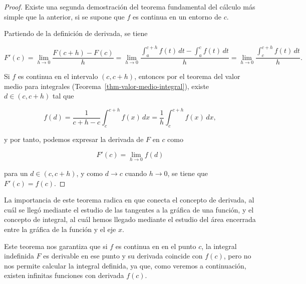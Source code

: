 \documentclass[
  a4paper,
]{scrreport}
\theoremstyle{plain}
\theoremstyle{definition}
\theoremstyle{plain}
\theoremstyle{plain}
\theoremstyle{definition}
\theoremstyle{definition}
\theoremstyle{remark}
\begin{document}
\begin{tcolorbox}[enhanced jigsaw, titlerule=0mm, arc=.35mm, colframe=quarto-callout-note-color-frame, bottomrule=.15mm, opacitybacktitle=0.6, rightrule=.15mm, coltitle=black, colback=white, toprule=.15mm, title=\textcolor{quarto-callout-note-color}{\faInfo}\hspace{0.5em}{Demostración 2}, leftrule=.75mm, bottomtitle=1mm, opacityback=0, breakable, colbacktitle=quarto-callout-note-color!10!white, toptitle=1mm, left=2mm]

\begin{proof}
Existe una segunda demostración del teorema fundamental del cálculo más
simple que la anterior, si se supone que \(f\) es continua en un entorno
de \(c\).

Partiendo de la definición de derivada, se tiene

\[
F'(c) 
= \lim_{h\to 0} \frac{F(c+h)-F(c)}{h} 
= \lim_{h\to 0} \frac{\int_a^{c+h}f(t)\,dt - \int_a^c f(t)\,dt}{h} 
= \lim_{h\to 0} \frac{\int_c^{c+h}f(t)\,dt}{h}.
\]

Si \(f\) es continua en el intervalo \((c, c+h)\), entonces por el
teorema del valor medio para integrales
(Teorema~\ref{thm-valor-medio-integral}), existe \(d\in(c,c+h)\) tal que

\[
f(d) 
= \frac{1}{c+h-c}\int_c^{c+h} f(x)\,dx 
= \frac{1}{h}\int_c^{c+h} f(x)\,dx,
\]

y por tanto, podemos expresar la derivada de \(F\) en \(c\) como

\[
F'(c) = \lim_{h\to 0} f(d)
\]

para un \(d\in(c,c+h)\), y como \(d\to c\) cuando \(h\to 0\), se tiene
que \(F'(c) = f(c)\).
\end{proof}

\end{tcolorbox}

La importancia de este teorema radica en que conecta el concepto de
derivada, al cuál se llegó mediante el estudio de las tangentes a la
gráfica de una función, y el concepto de integral, al cuál hemos llegado
mediante el estudio del área encerrada entre la gráfica de la función y
el eje \(x\).

\begin{tcolorbox}[enhanced jigsaw, titlerule=0mm, arc=.35mm, colframe=quarto-callout-warning-color-frame, bottomrule=.15mm, opacitybacktitle=0.6, rightrule=.15mm, coltitle=black, colback=white, toprule=.15mm, title=\textcolor{quarto-callout-warning-color}{\faExclamationTriangle}\hspace{0.5em}{Advertencia}, leftrule=.75mm, bottomtitle=1mm, opacityback=0, breakable, colbacktitle=quarto-callout-warning-color!10!white, toptitle=1mm, left=2mm]

Este teorema nos garantiza que si \(f\) es continua en en el punto
\(c\), la integral indefinida \(F\) es derivable en ese punto y su
derivada coincide con \(f(c)\), pero no nos permite calcular la integral
definida, ya que, como veremos a continuación, existen infinitas
funciones con derivada \(f(c)\).

\end{tcolorbox}
\end{document}
